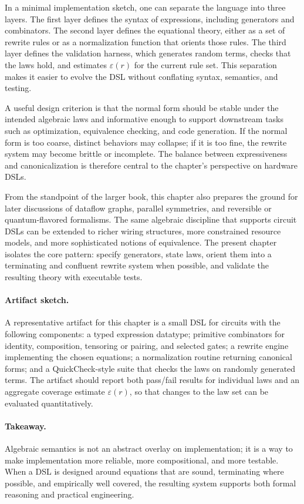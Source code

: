\documentclass[11pt]{article}
\begin{document}
In a minimal implementation sketch, one can separate the language into three layers. The first layer defines the syntax of expressions, including generators and combinators. The second layer defines the equational theory, either as a set of rewrite rules or as a normalization function that orients those rules. The third layer defines the validation harness, which generates random terms, checks that the laws hold, and estimates \(\varepsilon(r)\) for the current rule set. This separation makes it easier to evolve the DSL without conflating syntax, semantics, and testing.

A useful design criterion is that the normal form should be stable under the intended algebraic laws and informative enough to support downstream tasks such as optimization, equivalence checking, and code generation. If the normal form is too coarse, distinct behaviors may collapse; if it is too fine, the rewrite system may become brittle or incomplete. The balance between expressiveness and canonicalization is therefore central to the chapter's perspective on hardware DSLs.

From the standpoint of the larger book, this chapter also prepares the ground for later discussions of dataflow graphs, parallel symmetries, and reversible or quantum-flavored formalisms. The same algebraic discipline that supports circuit DSLs can be extended to richer wiring structures, more constrained resource models, and more sophisticated notions of equivalence. The present chapter isolates the core pattern: specify generators, state laws, orient them into a terminating and confluent rewrite system when possible, and validate the resulting theory with executable tests.

\paragraph{Artifact sketch.} A representative artifact for this chapter is a small DSL for circuits with the following components: a typed expression datatype; primitive combinators for identity, composition, tensoring or pairing, and selected gates; a rewrite engine implementing the chosen equations; a normalization routine returning canonical forms; and a QuickCheck-style suite that checks the laws on randomly generated terms. The artifact should report both pass/fail results for individual laws and an aggregate coverage estimate \(\varepsilon(r)\), so that changes to the law set can be evaluated quantitatively.

\paragraph{Takeaway.} Algebraic semantics is not an abstract overlay on implementation; it is a way to make implementation more reliable, more compositional, and more testable. When a DSL is designed around equations that are sound, terminating where possible, and empirically well covered, the resulting system supports both formal reasoning and practical engineering.
\end{document}
